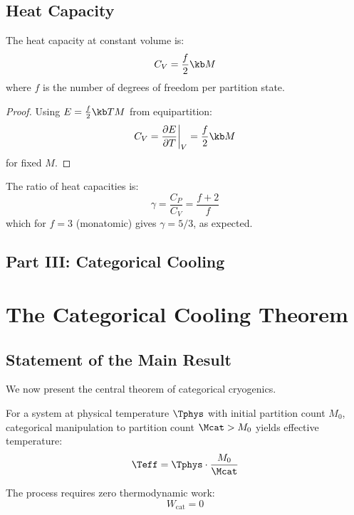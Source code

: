 \subsection{Heat Capacity}

\begin{theorem}
\label{thm:heat_capacity}
The heat capacity at constant volume is:
\begin{equation}
C_V = \frac{f}{2} \kb M
\label{eq:heat_capacity_cv}
\end{equation}
where $f$ is the number of degrees of freedom per partition state.
\end{theorem}

\begin{proof}
Using $E = \frac{f}{2} \kb T M$ from equipartition:
\begin{equation}
C_V = \frac{\partial E}{\partial T}\bigg|_V = \frac{f}{2} \kb M
\end{equation}
for fixed $M$.
\end{proof}

\begin{corollary}
The ratio of heat capacities is:
\begin{equation}
\gamma = \frac{C_P}{C_V} = \frac{f+2}{f}
\end{equation}
which for $f = 3$ (monatomic) gives $\gamma = 5/3$, as expected.
\end{corollary}


\subsection*{Part III: Categorical Cooling}

\section{The Categorical Cooling Theorem}

\subsection{Statement of the Main Result}

We now present the central theorem of categorical cryogenics.

\begin{theorem}
\label{thm:categorical_cooling}
For a system at physical temperature $\Tphys$ with initial partition count $M_0$, categorical manipulation to partition count $\Mcat > M_0$ yields effective temperature:
\begin{equation}
\Teff = \Tphys \cdot \frac{M_0}{\Mcat}
\label{eq:cooling_formula}
\end{equation}

The process requires zero thermodynamic work:
\begin{equation}
W_{\text{cat}} = 0
\label{eq:zero_work_cooling}
\end{equation}
\end{theorem}

